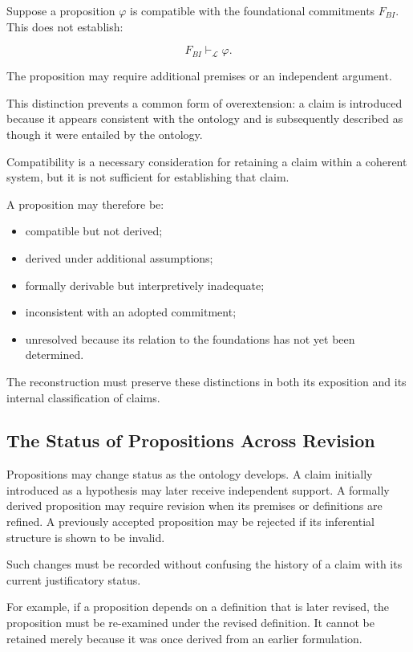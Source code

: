 Suppose a proposition \(\varphi\) is compatible with the
foundational commitments \(F_{BI}\). This does not establish:

\[
    F_{BI} \vdash_{\mathcal{L}} \varphi.
\]

The proposition may require additional premises or an
independent argument.

This distinction prevents a common form of overextension:
a claim is introduced because it appears consistent with
the ontology and is subsequently described as though it
were entailed by the ontology.

Compatibility is a necessary consideration for retaining
a claim within a coherent system, but it is not sufficient
for establishing that claim.

A proposition may therefore be:

\begin{itemize}
    \item compatible but not derived;
    \item derived under additional assumptions;
    \item formally derivable but interpretively inadequate;
    \item inconsistent with an adopted commitment;
    \item unresolved because its relation to the foundations
    has not yet been determined.
\end{itemize}

The reconstruction must preserve these distinctions in both
its exposition and its internal classification of claims.

\subsection{The Status of Propositions Across Revision}

Propositions may change status as the ontology develops.
A claim initially introduced as a hypothesis may later receive
independent support. A formally derived proposition may require
revision when its premises or definitions are refined. A
previously accepted proposition may be rejected if its
inferential structure is shown to be invalid.

Such changes must be recorded without confusing the history
of a claim with its current justificatory status.

For example, if a proposition depends on a definition that
is later revised, the proposition must be re-examined under
the revised definition. It cannot be retained merely because
it was once derived from an earlier formulation.

